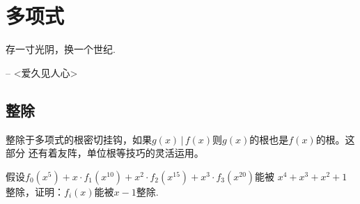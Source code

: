 \chapter{多项式}

\begin{introduction}
	\item 存一寸光阴，换一个世纪.
	\item -- <爱久见人心>
\end{introduction}

\section{整除}

整除于多项式的根密切挂钩，如果$g(x) \, | \, f(x)$则$g(x)$的根也是$f(x)$的根。这部分
还有着友阵，单位根等技巧的灵活运用。

\begin{proposition}
	假设$f_0(x^5) + x\cdot f_1(x^{10}) + x^2 \cdot f_2(x^{15}) + x^3 \cdot f_3(x^{20})$能被
	$x^4+x^3+x^2+1$整除，证明：$f_i(x)$能被$x-1$整除.
\end{proposition}

